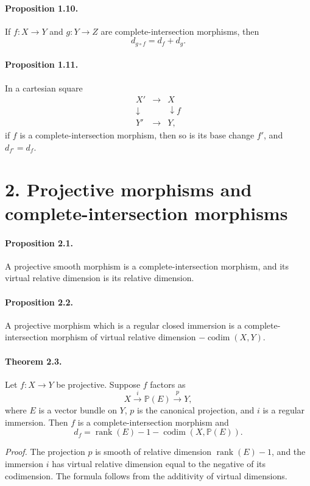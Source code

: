 \documentclass[11pt]{article}
\theoremstyle{plain}
\theoremstyle{definition}
\theoremstyle{remark}
\newcommand{\bbP}{\mathbb P}
\DeclareMathOperator{\rank}{rank}
\DeclareMathOperator{\codim}{codim}
\providecommand{\codim}{\operatorname{codim}}
\providecommand{\xto}[1]{\xrightarrow{#1}}
\begin{document}
\paragraph{Proposition 1.10.} If $f:X\to Y$ and $g:Y\to Z$ are complete-intersection morphisms, then
\[
d_{g\circ f}=d_f+d_g.
\]

\paragraph{Proposition 1.11.} In a cartesian square
\[
\begin{array}{ccc}
X'&\longrightarrow&X\\
\downarrow&&\downarrow f\\
Y'&\longrightarrow&Y,
\end{array}
\]
if $f$ is a complete-intersection morphism, then so is its base change $f'$, and $d_{f'}=d_f$.

\section*{2. Projective morphisms and complete-intersection morphisms}

\paragraph{Proposition 2.1.} A projective smooth morphism is a complete-intersection morphism, and its virtual relative dimension is its relative dimension.

\paragraph{Proposition 2.2.} A projective morphism which is a regular closed immersion is a complete-intersection morphism of virtual relative dimension $-\codim(X,Y)$.

\paragraph{Theorem 2.3.} Let $f:X\to Y$ be projective. Suppose $f$ factors as
\[
X\xto{i}\bbP(E)\xto{p}Y,
\]
where $E$ is a vector bundle on $Y$, $p$ is the canonical projection, and $i$ is a regular immersion. Then $f$ is a complete-intersection morphism and
\[
d_f=\rank(E)-1-\codim(X,\bbP(E)).
\]

\emph{Proof.} The projection $p$ is smooth of relative dimension $\rank(E)-1$, and the immersion $i$ has virtual relative dimension equal to the negative of its codimension. The formula follows from the additivity of virtual dimensions.
\end{document}
